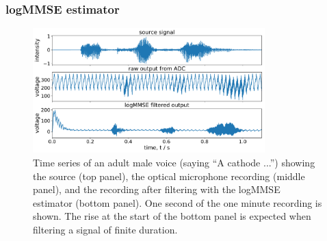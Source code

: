 \documentclass[paper-main.tex]{subfiles}
\begin{document}








\subsubsection{logMMSE estimator}
\label{sec:logmmse}


\begin{figure}
	\includegraphics[width=0.8\textwidth]{figures/combined_timeseries_melatos.pdf}
	\caption{Time series of an adult male voice (saying ``A cathode ...'') showing the source (top panel), the optical microphone recording (middle panel), and the recording after filtering with the logMMSE estimator (bottom panel). One second of the one minute recording is shown. The rise at the start of the bottom panel is expected when filtering a signal of finite duration.}
	\label{fig:logMMSE_timeseries}
\end{figure}
\end{document}
